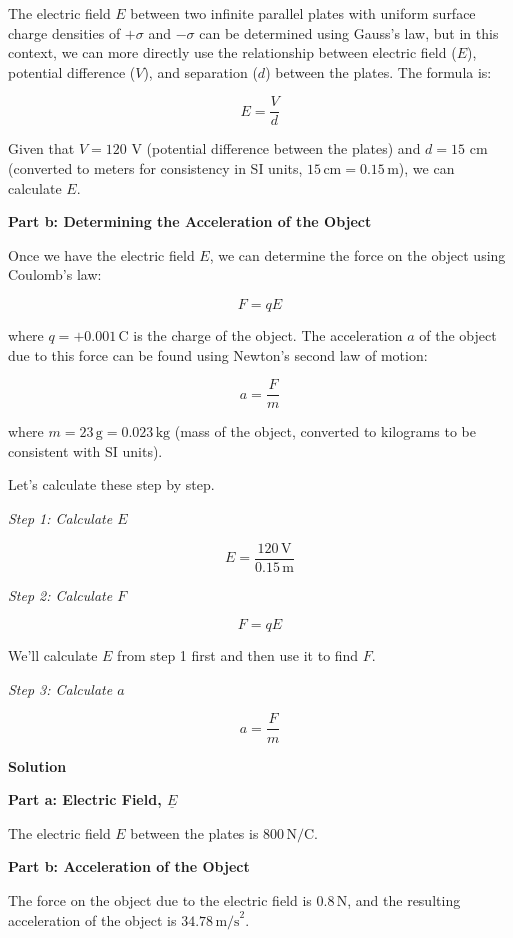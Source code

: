 The electric field \( E \) between two infinite parallel plates with uniform surface charge densities of \( +\sigma \) and \( -\sigma \) can be determined using Gauss's law, but in this context, we can more directly use the relationship between electric field (\( E \)), potential difference (\( V \)), and separation (\( d \)) between the plates. The formula is:

\[
E = \frac{V}{d}
\]

Given that \( V = 120 \) V (potential difference between the plates) and \( d = 15 \) cm (converted to meters for consistency in SI units, \( 15 \, \text{cm} = 0.15 \, \text{m} \)), we can calculate \( E \).

\textbf{Part b: Determining the Acceleration of the Object}

Once we have the electric field \( E \), we can determine the force on the object using Coulomb's law:

\[
F = qE
\]

where \( q = +0.001 \, \text{C} \) is the charge of the object. The acceleration \( a \) of the object due to this force can be found using Newton's second law of motion:

\[
a = \frac{F}{m}
\]

where \( m = 23 \, \text{g} = 0.023 \, \text{kg} \) (mass of the object, converted to kilograms to be consistent with SI units).

Let's calculate these step by step.

\textit{Step 1: Calculate \( E \)}

\[
E = \frac{120 \, \text{V}}{0.15 \, \text{m}}
\]

\textit{Step 2: Calculate \( F \)}

\[
F = qE
\]

We'll calculate \( E \) from step 1 first and then use it to find \( F \).

\textit{Step 3: Calculate \( a \)}

\[
a = \frac{F}{m}
\]

\textbf{Solution}

\textbf{Part a: Electric Field, \( \underline{E} \)}

The electric field \( E \) between the plates is \( 800 \, \text{N/C} \).

\textbf{Part b: Acceleration of the Object}

The force on the object due to the electric field is \( 0.8 \, \text{N} \), and the resulting acceleration of the object is \( 34.78 \, \text{m/s}^2 \).

